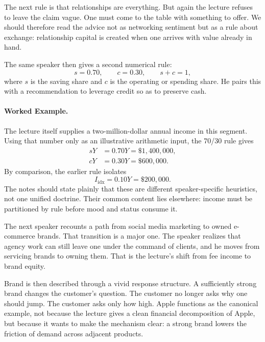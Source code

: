 The next rule is that relationships are everything. But again the lecture refuses to leave the claim vague. One must come to the table with something to offer. We should therefore read the advice not as networking sentiment but as a rule about exchange: relationship capital is created when one arrives with value already in hand.

The same speaker then gives a second numerical rule:
\begin{equation}
s=0.70,\qquad c=0.30,\qquad s+c=1,
\end{equation}
where $s$ is the saving share and $c$ is the operating or spending share. He pairs this with a recommendation to leverage credit so as to preserve cash.

\paragraph{Worked Example.}
The lecture itself supplies a two-million-dollar annual income in this segment. Using that number only as an illustrative arithmetic input, the 70/30 rule gives
\begin{align}
sY &= 0.70Y = \$1{,}400{,}000,\\
cY &= 0.30Y = \$600{,}000.
\end{align}
By comparison, the earlier rule isolates
\begin{equation}
I_{\mathrm{idx}}=0.10Y=\$200{,}000.
\end{equation}
The notes should state plainly that these are different speaker-specific heuristics, not one unified doctrine. Their common content lies elsewhere: income must be partitioned by rule before mood and status consume it.

The next speaker recounts a path from social media marketing to owned e-commerce brands. That transition is a major one. The speaker realizes that agency work can still leave one under the command of clients, and he moves from servicing brands to owning them. That is the lecture's shift from fee income to brand equity.

Brand is then described through a vivid response structure. A sufficiently strong brand changes the customer's question. The customer no longer asks why one should jump. The customer asks only how high. Apple functions as the canonical example, not because the lecture gives a clean financial decomposition of Apple, but because it wants to make the mechanism clear: a strong brand lowers the friction of demand across adjacent products.


